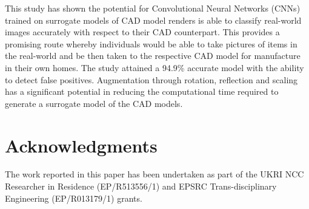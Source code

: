 \documentclass[a4paper, 11pt]{article}
\begin{document}
This study has shown the potential for Convolutional Neural Networks (CNNs) trained on surrogate models of CAD model renders is able to classify real-world images accurately with respect to their CAD counterpart. This provides a promising route whereby individuals would be able to take pictures of items in the real-world and be then taken to the respective CAD model for manufacture in their own homes. The study attained a 94.9\% accurate model with the ability to detect false positives. Augmentation through rotation, reflection and scaling has a significant potential in reducing the computational time required to generate a surrogate model of the CAD models.


\section*{Acknowledgments}

The work reported in this paper has been undertaken as part of the UKRI NCC Researcher in Residence (EP/R513556/1) and EPSRC Trans-disciplinary Engineering (EP/R013179/1) grants.

\printbibliography[]{}
\end{document}
